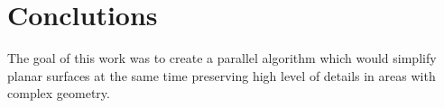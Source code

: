 \chapter{Conclutions}
\thispagestyle{empty}%

The goal of this work was to create a parallel algorithm which would simplify planar surfaces at the same time preserving high level of details in areas with complex geometry.
